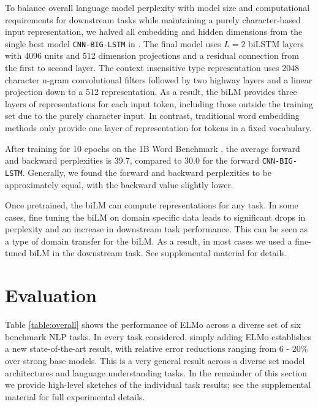 \documentclass[11pt,a4paper]{article}
\newcommand{\ELMO}{ELMo}
\begin{document}
To balance overall language model perplexity with model size and computational requirements for downstream tasks while maintaining a purely character-based input representation, we halved all embedding and hidden dimensions from the single best model \texttt{CNN-BIG-LSTM} in \citet{Jzefowicz2016ExploringTL}.
The final model uses $L=2$ biLSTM layers with 4096 units and 512 dimension projections and a residual connection from the first to second layer.
The context insensitive type representation uses 2048 character n-gram convolutional filters followed by two highway layers \citep{Srivastava2015TrainingVD} and a linear projection down to a 512 representation.
As a result, the biLM provides three layers of representations for each input token, including those outside the training set due to the purely character input.
In contrast, traditional word embedding methods only provide one layer of representation for tokens in a fixed vocabulary.

After training for 10 epochs on the 1B Word Benchmark \citep{Chelba2014OneBW}, the average forward and backward perplexities is 39.7, compared to 30.0 for the forward \texttt{CNN-BIG-LSTM}.
Generally, we found the forward and backward perplexities to be approximately equal, with the backward value slightly lower.

Once pretrained, the biLM can compute representations for any task.
In some cases, fine tuning the biLM on domain specific data leads to significant drops in perplexity and an increase in downstream task performance.
This can be seen as a type of domain transfer for the biLM.
As a result, in most cases we used a fine-tuned biLM in the downstream task.
See supplemental material for details.

\section{Evaluation}
\label{sec:results}
Table \ref{table:overall} shows the performance of \ELMO{} across a diverse set of six benchmark NLP tasks.
In every task considered, simply adding \ELMO{} establishes a new state-of-the-art result, with relative error reductions ranging from 6 - 20\% over strong base models.
This is a very general result across a diverse set model architectures and language understanding tasks.
In the remainder of this section we provide high-level sketches of the individual task results; see the supplemental material for full experimental details.
\end{document}
